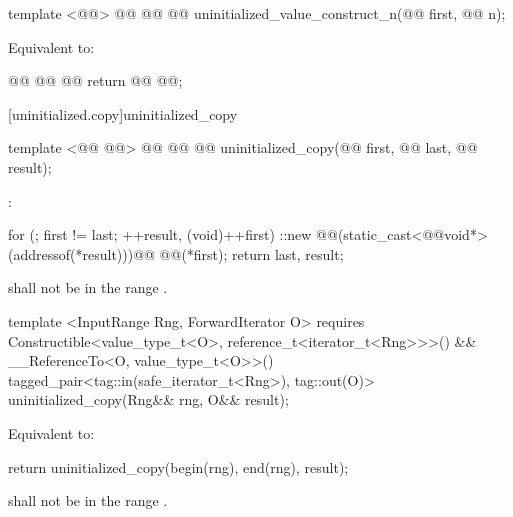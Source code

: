 \begin{codeblock}
  template <@@>
    @@
            @@
  @@
    uninitialized_value_construct_n(@@ first, @@ n);
\end{codeblock}

\pnum
\effects Equivalent to:
\begin{codeblock}
        @@
          @@
            @@
        return @@
                                                             @@;
\end{codeblock}

[uninitialized.copy]{uninitialized_copy}
\begin{codeblock}
  template <@@
            @@>
    @@
            @@
  @@
    uninitialized_copy(@@ first, @@ last, @@ result);
\end{codeblock}

\setcounter{Paras}{0}
\pnum
\effects {}:
\begin{codeblock}
        for (; first != last; ++result, (void)++first)
          ::new @@(static_cast<@@void*>(addressof(*result)))@\added{)}@
            @@(*first);
        return {last, result};
\end{codeblock}

{\color{addclr}
\pnum
\requires {} shall not be in the range \tcode{[first, last)}.

\begin{codeblock}
  template <InputRange Rng, ForwardIterator O>
    requires Constructible<value_type_t<O>, reference_t<iterator_t<Rng>>>() &&
             __ReferenceTo<O, value_type_t<O>>()
  tagged_pair<tag::in(safe_iterator_t<Rng>), tag::out(O)>
    uninitialized_copy(Rng&& rng, O&& result);
\end{codeblock}

\pnum
\effects Equivalent to:
\begin{codeblock}
        return uninitialized_copy(begin(rng), end(rng), result);
\end{codeblock}
\pnum
\requires {} shall not be in the range \tcode{[begin(rng), end(rng))}.
} %

